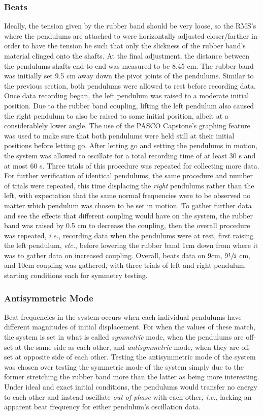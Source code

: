 \documentclass[12pt]{article}
\begin{document}
\begin{multicols}{2}
\subsubsection{Beats}
Ideally, the tension given by the rubber band should be very loose,
so the RMS's where the pendulums are attached to were horizontally adjusted closer/farther in order to have the tension be such that only the slickness of the rubber band's material clinged onto the shafts.
At the final adjustment, the distance between the pendulums shafts end-to-end was measured to be 8.45 cm.
The rubber band was initially set 9.5 cm away down the pivot joints of the pendulums.
Similar to the previous section, both pendulums were allowed to rest before recording data.
Once data recording began, the left pendulum was raised to a moderate initial position.
Due to the rubber band coupling, lifting the left pendulum also caused the right pendulum to also be raised to some initial position, albeit at a considerablely lower angle.
The use of the PASCO Capstone's graphing feature was used to make sure that both pendulums were held still at their initial positions before letting go.
After letting go and setting the pendulums in motion, the system was allowed to oscillate for a total recording time of at least 30 s and at most 60 s.
Three trials of this procedure was repeated for collecting more data.
For further verification of identical pendulums, the same procedure and number of trials were repeated, 
this time displacing the \textit{right} pendulums rather than the left, with expectation that the same normal frequencies were to be observed no matter which pendulum was chosen to be set in motion.
To gather further data and see the effects that different coupling would have on the system, the rubber band was raised by 0.5 cm to decrease the coupling,
then the overall procedure was repeated, \textit{i.e.}, recording data when the pendulums were at rest, first raising the left pendulum, \textit{etc.},
before lowering the rubber band 1cm down from where it was to gather data on increased coupling.
Overall, beats data on 9cm, 9$\sfrac{1}{2}$ cm, and 10cm coupling was gathered, with three trials of left and right pendulum starting conditions each for symmetry testing. 

\subsubsection{Antisymmetric Mode}
Beat frequencies in the system occurs when each individual pendulums have different magnitudes of initial displacement.
For when the values of these match, the system is set in what is called \textit{symmetric} mode,
when the pendulums are off-set at the same side as each other,
and \textit{antisymmetric} mode, when they are off-set at opposite side of each other.
Testing the antisymmetric mode of the system was chosen over testing the symmetric mode of the system simply due to the former stretching the rubber band more than the latter as being more interesting.
Under ideal and exact initial conditions, the pendulums would transfer no energy to each other and instead oscillate \textit{out of phase} with each other,
\textit{i.e.}, lacking an apparent beat frequency for either pendulum's oscillation data.


\end{multicols}
\end{document}
